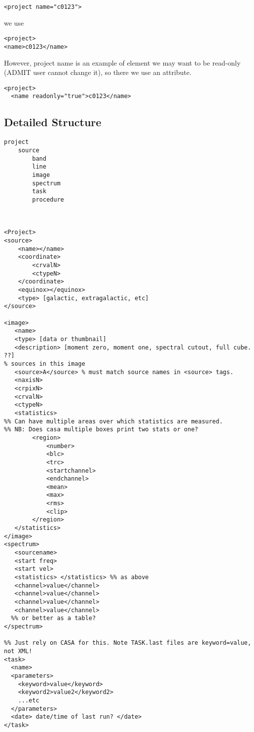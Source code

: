\documentclass{report}
\begin{document}
\begin{verbatim}
<project name="c0123">  
\end{verbatim}

we use 

\begin{verbatim}
<project>
<name>c0123</name>
\end{verbatim}

However, project name is an example of element we may want to be read-only
(ADMIT user cannot change it), so there we use an attribute.

\begin{verbatim}
<project>
  <name readonly="true">c0123</name>
\end{verbatim}

\subsection{Detailed Structure}
\begin{verbatim}
project
    source
        band
        line 
        image
        spectrum
        task
        procedure
    


<Project>
<source>
    <name></name>
    <coordinate>
        <crvalN>
        <ctypeN>
    </coordinate>
    <equinox></equinox>
    <type> [galactic, extragalactic, etc]
</source>

<image>
   <name>
   <type> [data or thumbnail]
   <description> [moment zero, moment one, spectral cutout, full cube. ??] 
% sources in this image
   <source>A</source> % must match source names in <source> tags.
   <naxisN>
   <crpixN>
   <crvalN>
   <ctypeN>
   <statistics>
%% Can have multiple areas over which statistics are measured.
%% NB: Does casa multiple boxes print two stats or one?
        <region>
            <number>
            <blc>
            <trc>
            <startchannel>
            <endchannel>
            <mean>
            <max>
            <rms>
            <clip>
        </region>
   </statistics>
</image>
<spectrum>
   <sourcename>
   <start freq>
   <start vel>
   <statistics> </statistics> %% as above
   <channel>value</channel>
   <channel>value</channel>
   <channel>value</channel>
   <channel>value</channel> 
  %% or better as a table?
</spectrum>

%% Just rely on CASA for this. Note TASK.last files are keyword=value, not XML!
<task>
  <name>
  <parameters>
    <keyword>value</keyword>
    <keyword2>value2</keyword2>
    ...etc
  </parameters>
  <date> date/time of last run? </date>
</task>
\end{verbatim}
\end{document}
